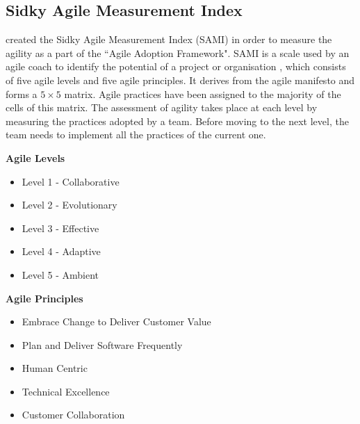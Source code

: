 \subsection{Sidky Agile Measurement Index}
\citet{sidky_dissertation} created the Sidky Agile Measurement Index (SAMI) in order to measure the agility as a part of the ``Agile Adoption Framework". SAMI is a scale used by an agile coach to identify the potential of a project or organisation \cite{sidky}, which consists of five agile levels and five agile principles. It derives from the agile manifesto \cite{beck2001agile} and forms a $5\times 5$ matrix. Agile practices have been assigned to the majority of the cells of this matrix. The assessment of agility takes place at each level by measuring the practices adopted by a team. Before moving to the next level, the team needs to implement all the practices of the current one.

\begin{minipage}[t]{0.35\linewidth}
    \textbf{Agile Levels}
    \begin{itemize}
    \item{Level 1 - Collaborative}
    \item{Level 2 - Evolutionary}
    \item{Level 3 - Effective}
    \item{Level 4 - Adaptive}
    \item{Level 5 - Ambient}
    \end{itemize}
    \end{minipage}
    \begin{minipage}[t]{0.6\linewidth}
    \textbf{Agile Principles}
    \begin{itemize}
    \item{Embrace Change to Deliver Customer Value}
    \item{Plan and Deliver Software Frequently}
    \item{Human Centric}
    \item{Technical Excellence}
    \item{Customer Collaboration}
    \end{itemize}
\end{minipage}


